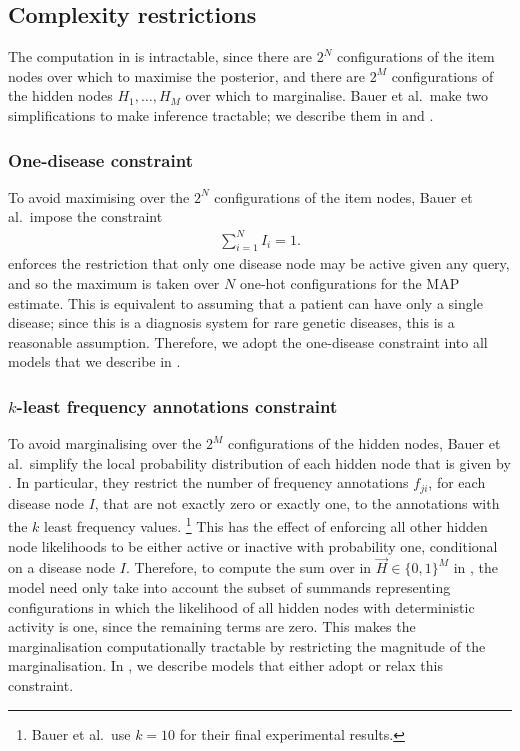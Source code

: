 \subsection{Complexity restrictions}

The computation in  is intractable, since 
there are $2^N$ configurations of the item nodes over which to maximise the
posterior, and there are $2^M$ configurations of the hidden nodes $H_1, \hdots,
H_M$ over which to marginalise.
%
Bauer et al.\ make two simplifications to make inference tractable; we describe
them in  and .

\subsubsection{One-disease constraint}
\label{subsubsec:odc}

To avoid maximising over the $2^N$ configurations of the item nodes, Bauer et al.\
impose the constraint
%
\begin{align}
    \sum_{i=1}^N I_i = 1. \label{eq:onehot}
\end{align}
%
 enforces the restriction that only one disease node may be
active given any query, and so the maximum is taken over $N$ one-hot
configurations for the MAP estimate.
%
This is equivalent to assuming that a patient can have only a single disease;
%
since this is a diagnosis system for rare genetic diseases, this is a reasonable
assumption.
%
Therefore, we adopt the one-disease constraint into all models that we describe
in \Section{sec:models}.

\subsubsection{$k$-least frequency annotations constraint}
\label{subsubsec:kleast}

To avoid marginalising over the $2^M$ configurations of the hidden nodes,
Bauer et al.\ simplify the local probability distribution of each hidden node
that is given by \Equation{eq:lpdhids}.
%
In particular, they restrict the number of frequency annotations $f_{ji}$, for
each disease node $I$, that are not exactly zero or exactly one, to the
annotations with the $k$ least frequency values.
%
\footnote{
    Bauer et al.\ use $k=10$ for their final experimental results.
}
%
This has the effect of enforcing all other hidden node likelihoods
to be either active or inactive with probability one,
conditional on a disease node $I$.
%
Therefore, to compute the sum over in $\vec{H} \in \{0, 1\}^M$ in
\Equation{eq:mapinf}, the model need only take into account the subset of
summands representing configurations in which the likelihood of all hidden nodes
with deterministic activity is one, since the remaining terms are zero.
%
This makes the marginalisation computationally tractable by restricting the
magnitude of the marginalisation.
%
In , we describe models that either adopt or relax this
constraint.

